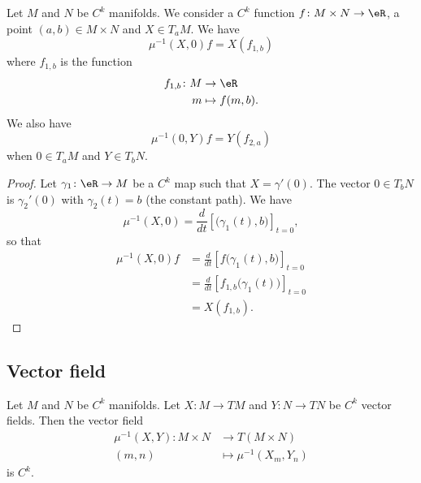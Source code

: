 \begin{proposition}	\label{PROPooYACVooMwEhBj}
	Let \( M\) and \( N\) be \( C^k\) manifolds. We consider a \( C^k\) function \(f \colon M\times N\to \eR  \), a point \( (a,b)\in M\times N\) and \(X\in T_aM \). We have
	\begin{equation}
		\mu^{-1}(X,0)f=X(f_{1,b})
	\end{equation}
	where \( f_{1,b}\) is the function
	\begin{equation}
		\begin{aligned}
			f_{1,b}\colon M & \to \eR         \\
			m               & \mapsto f(m,b).
		\end{aligned}
	\end{equation}
	We also have
	\begin{equation}		\label{EQooNAGYooKZCLKz}
		\mu^{-1}(0,Y)f =Y(f_{2,a})
	\end{equation}
	when \( 0\in T_aM\) and \( Y\in T_bN\).
\end{proposition}

\begin{proof}
	Let \(\gamma_1 \colon \eR\to M  \) be a \( C^k\) map such that \( X=\gamma'(0)\). The vector \( 0\in T_bN\) is \( \gamma_2'(0)\) with \( \gamma_2(t)=b\) (the constant path). We have
	\begin{equation}
		\mu^{-1}(X,0)=\frac{d}{dt} \left[ \big( \gamma_1(t),b \big)  \right]_{t=0},
	\end{equation}
	so that
	\begin{subequations}
		\begin{align}
			\mu^{-1}(X,0)f & =\frac{d}{dt} \left[ f\big( \gamma_1(t),b \big)  \right]_{t=0}     \\
			               & =\frac{d}{dt} \left[ f_{1,b}\big( \gamma_1(t) \big)  \right]_{t=0} \\
			               & =X(f_{1,b}).
		\end{align}
	\end{subequations}
\end{proof}


\subsection{Vector field}

\begin{proposition}	\label{PROPooKGDFooQeEVOl}
	Let \( M\) and \( N\) be \( C^k\) manifolds. Let \(X \colon M\to TM  \) and \(Y \colon N\to TN  \) be \( C^k\) vector fields. Then the vector field
	\begin{equation}
		\begin{aligned}
			\mu^{-1}(X,Y)\colon M\times N & \to T(M\times N)          \\
			(m,n)                         & \mapsto \mu^{-1}(X_m,Y_n)
		\end{aligned}
	\end{equation}
	is \( C^k\).
\end{proposition}

